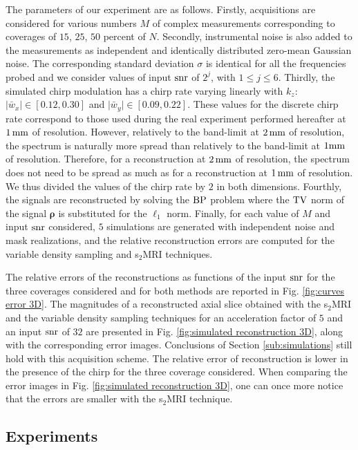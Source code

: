 \documentclass[10pt,draftcls, onecolumn]{IEEEtran}
\begin{document}
The parameters of our experiment are as follows. Firstly, acquisitions are considered for various numbers $M$ of complex measurements corresponding to coverages of $15$, $25$, $50$ percent of $N$. Secondly, instrumental noise is also added to the measurements as independent and identically distributed zero-mean Gaussian noise. The corresponding standard deviation $\sigma$ is identical for all the frequencies probed and we consider values of input ${\rm snr}$ of $2^j$, with $1\leq j \leq 6$. Thirdly, the simulated chirp modulation has a chirp rate varying linearly with $k_z$: $\vert \bar{w}_x \vert \in [0.12, 0.30]$ and $\vert \bar{w}_y \vert \in [0.09, 0.22]$. These values for the discrete chirp rate correspond to those used during the real experiment performed hereafter at $1 \, \rm{mm}$ of resolution. However, relatively to the band-limit at $2 \, \rm{mm}$ of resolution, the spectrum is naturally more spread than relatively to the band-limit at $1 \rm{mm}$ of resolution. Therefore, for a reconstruction at $2 \, \rm{mm}$ of resolution, the spectrum does not need to be spread as much as for a reconstruction at $1 \, \rm{mm}$ of resolution. We thus divided the values of the chirp rate by $2$ in both dimensions. Fourthly, the signals are reconstructed by solving the ${\rm BP}$ problem where the ${\rm TV}$ norm of the signal $\bm \rho$ is substituted for the $\ell_1$ norm. Finally, for each value of $M$ and input ${\rm snr}$ considered, $5$ simulations are generated with independent noise and mask realizations, and the relative reconstruction errors are computed for the variable density sampling and s$_2$MRI techniques.

The relative errors of the reconstructions as functions of the input ${\rm snr}$ for the three coverages considered and for both methods are reported in Fig. \ref{fig:curves error 3D}. The magnitudes of a reconstructed axial slice obtained with the s$_2$MRI and the variable density sampling techniques for an acceleration factor of $5$ and an input $\rm snr$ of $32$ are presented in Fig. \ref{fig:simulated reconstruction 3D}, along with the corresponding error images. Conclusions of Section \ref{sub:simulations} still hold with this acquisition scheme. The relative error of reconstruction is lower in the presence of the chirp for the three coverage considered. When comparing the error images in Fig. \ref{fig:simulated reconstruction 3D}, one can once more notice that the errors are smaller with the s$_2$MRI technique.

\subsection{Experiments}
\end{document}
